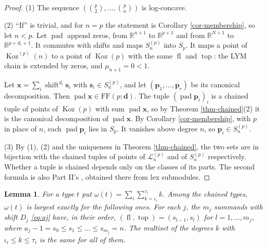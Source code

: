 \documentclass[11pt, a4paper, abstract=yes]{scrartcl}
\theoremstyle{definition}
\theoremstyle{remark}
\theoremstyle{plain}
\newtheorem{lemma}[definition]{Lemma}
\newcommand{\vek}[1]{\boldsymbol{#1}}
\theoremstyle{remark}
\theoremstyle{plain}
\newcommand{\Koz}{\operatorname{Koz}}
\newcommand{\shift}{\operatorname{shift}}
\newcommand{\tp}{\operatorname{top}}
\newcommand{\FF}{\mathrm{FF}}
\newcommand{\fl}{\operatorname{fl}}
\newcommand{\leannone}{\tikz[baseline=-0.6ex]\draw[leannone,line width=0.6pt] (0,0) circle (0.55ex);}
\newcommand{\leanmark}[1]{\leavevmode{\reversemarginpar\marginnote{\raggedleft#1}}}
\begin{document}
\begin{proof}
(1) The sequence \((\binom p2,\dots,\binom pn)\) is log-concave.

(2) ``If'' is trivial, and for \(n=p\) the statement is Corollary \ref{cor-membership}, so let \(n<p\).
Let \(\operatorname{pad}\) append zeros, from \(\mathbb R^{n+1}\) to \(\mathbb R^{p+1}\) and from
\(\mathbb R^{N+1}\) to \(\mathbb R^{p+d_r+1}\). It commutes with shifts and maps \(S_n^{(p)}\) into
\(S_p\). It maps a point of \(\Koz^{(p)}(n)\) to a point of \(\Koz(p)\) with the same \(\fl\) and
\(\tp\): the LYM chain is extended by zeros, and \(\mu_{n+1}=0<1\).

Let \(\vek x=\sum_i\shift^{d_i}\vek s_i\) with \(\vek s_i\in S_n^{(p)}\), and let
\((\vek p_1,\dots,\vek p_r)\) be its canonical decomposition. Then
\(\operatorname{pad}\vek x\in\FF(p;\vek d)\). The tuple \((\operatorname{pad}\vek p_i)_i\) is a
chained tuple of points of \(\Koz(p)\) with sum \(\operatorname{pad}\vek x\), so by
Theorem \ref{thm-chained}(2) it is the canonical decomposition of \(\operatorname{pad}\vek x\). By
Corollary \ref{cor-membership}, with \(p\) in place of \(n\), each \(\operatorname{pad}\vek p_i\) lies
in \(S_p\). It vanishes above degree \(n\), so \(\vek p_i\in S_n^{(p)}\).

(3) By (1), (2) and the uniqueness in Theorem \ref{thm-chained}, the two sets are in bijection with
the chained tuples of points of \(\mathcal L_n^{(p)}\) and of \(S_n^{(p)}\) respectively. Whether a
tuple is chained depends only on the classes of its parts. The second formula is also Part II's
\autocite[Theorem 60]{SnellmanArticle2}, obtained there from lex submodules.
\end{proof}

\begin{lemma}
\leanmark{\leannone}For a type \(t\) put \(\omega(t)=\sum_i\sum_{k=\iota_i}^{\tau_i}k\). Among the chained types, \(\omega(t)\) is
largest exactly for the following ones. For each \(j\), the \(m_j\) summands with shift \(D_j\) \eqref{eq:aj}
have, in their order, \((\fl,\tp)=(s_{l-1},s_l)\) for \(l=1,\dots,m_j\), where
\(a_j-1=s_0\le s_1\le\dots\le s_{m_j}=n\). The multiset of the degrees \(k\) with
\(\iota_i\le k\le\tau_i\) is the same for all of them.
\label{lem-kup-dominant}
\end{lemma}
\end{document}
